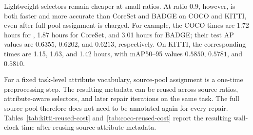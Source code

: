 \begin{table}[t]
\centering
\caption{COCO first-repair wall-clock time. Every \model row includes 90 minutes for fresh assignment of all 20,000 source images.}
\label{tab:coco-end-to-end-cost}
\footnotesize
\setlength{\tabcolsep}{2.5pt}
\end{table}

Lightweight selectors remain cheaper at small ratios. At ratio $0.9$, however, \model is both faster and more accurate than CoreSet and BADGE on COCO and KITTI, even after full-pool assignment is charged. For example, the COCO times are 1.72 hours for \model, 1.87 hours for CoreSet, and 3.01 hours for BADGE; their test AP values are $0.6355$, $0.6202$, and $0.6213$, respectively. On KITTI, the corresponding times are 1.15, 1.63, and 1.42 hours, with mAP50--95 values $0.5850$, $0.5781$, and $0.5810$.

For a fixed task-level attribute vocabulary, source-pool assignment is a one-time preprocessing step. The resulting metadata can be reused across source ratios, attribute-aware selectors, and later repair iterations on the same task. The full source pool therefore does not need to be annotated again for every repair. Tables~\ref{tab:kitti-reused-cost} and~\ref{tab:coco-reused-cost} report the resulting wall-clock time after reusing source-attribute metadata.


